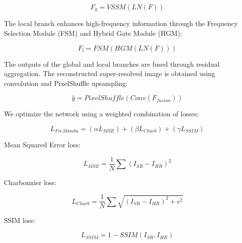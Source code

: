 \documentclass[conference]{IEEEtran}
\begin{document}
\begin{equation}
F_{g} = VSSM(LN(F))
\end{equation}

The local branch enhances high-frequency information through the Frequency Selection Module (FSM) and Hybrid Gate Module (HGM):

\begin{equation}
F_{l} = FSM(HGM(LN(F)))
\end{equation}

The outputs of the global and local branches are fused through residual aggregation. The reconstructed super-resolved image is obtained using convolution and PixelShuffle upsampling:

\begin{equation}
\hat{y} = PixelShuffle(Conv(F_{fusion}))
\end{equation}

We optimize the network using a weighted combination of losses:

\begin{equation}
L_{FreMamba} = (\alpha L_{MSE}) + (\beta L_{Charb}) + (\gamma L_{SSIM})
\end{equation}

Mean Squared Error loss:

\begin{equation}
L_{MSE} = \frac{1}{N}\sum (I_{SR} - I_{HR})^{2}
\end{equation}

Charbonnier loss:

\begin{equation}
L_{Charb} = \frac{1}{N}\sum \sqrt{(I_{SR}-I_{HR})^{2}+\epsilon^{2}}
\end{equation}

SSIM loss:

\begin{equation}
L_{SSIM} = 1 - SSIM(I_{SR},I_{HR})
\end{equation}
\end{document}
